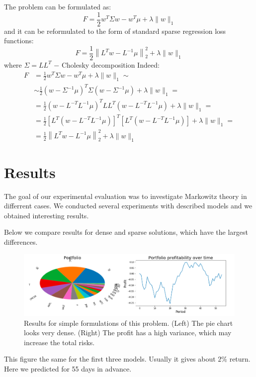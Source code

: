 \documentclass{article}
\begin{document}
The problem can be formulated as:
\[F = \frac{1}{2} w^T \Sigma w - w^T \mu + \lambda \|w\|_1\]
and it can be reformulated to the form of standard sparse regression loss functions:
$$F = \frac{1}{2} \left \|L^T  w - L^{-1} \mu \right\|_2^2 + \lambda  \| w\|_1$$
where $\Sigma = L L^T$ $-$ Cholesky decomposition
Indeed:
\begin{align*}
F &= \frac{1}{2} w^T \Sigma w - w^T \mu + \lambda \|w\|_1 \sim\\
& \sim \frac{1}{2} \left(w - \Sigma^{-1} \mu \right)^T \Sigma \left(w - \Sigma^{-1} \mu \right) + \lambda \|w\|_1 = \\
& = \frac{1}{2} \left(w - L^{-T} L^{-1} \mu \right)^T L L^{T}  \left(w - L^{-T} L^{-1}  \mu \right) + \lambda \|w\|_1 = \\
& = \frac{1}{2} \left[ L^T \left(w - L^{-T} L^{-1} \mu \right) \right]^T  \left[ L^T \left(w - L^{-T} L^{-1} \mu \right) \right]+ \lambda \|w\|_1 = \\
& = \frac{1}{2} \left \|L^T  w - L^{-1} \mu \right\|_2^2 + \lambda  \| w\|_1
\end{align*}
\section{Results}
The goal of our experimental evaluation was to investigate Markowitz theory in differrent cases. We conducted several experiments with described models and we obtained interesting results. 

Below we compare results for dense and sparse solutions, which have the largest differences.

\begin{figure}[!htb]
\centering
\caption{Results for simple formulations of this problem. (Left) The pie chart looks very dense. (Right) The profit has a high variance, which may increase the total risks.}
\includegraphics[width=1\textwidth]{image1.png}
\end{figure}

This figure the same for the first three models. Usually it gives about $2\%$ return. Here we predicted for 55 days in advance.
\end{document}
